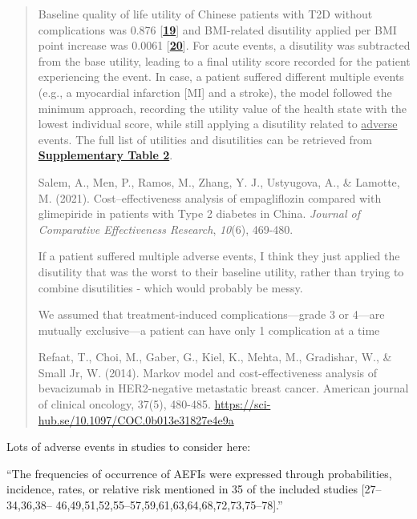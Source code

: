 \documentclass[
]{article}
\begin{document}
\begin{quote}
Baseline quality of life utility of Chinese patients with T2D without
complications was 0.876
{[}\href{https://www.futuremedicine.com/reader/content/17e4aa15614/10.2217/cer-2020-0284/format/epub/EPUB/xhtml/index.xhtml\#B19}{\textbf{19}}{]}
and BMI-related disutility applied per BMI point increase was 0.0061
{[}\href{https://www.futuremedicine.com/reader/content/17e4aa15614/10.2217/cer-2020-0284/format/epub/EPUB/xhtml/index.xhtml\#B20}{\textbf{20}}{]}.
For acute events, a disutility was subtracted from the base utility,
leading to a final utility score recorded for the patient experiencing
the event. In case, a patient suffered different multiple events (e.g.,
a myocardial infarction {[}MI{]} and a stroke), the model followed the
minimum approach, recording the utility value of the health state with
the lowest individual score, while still applying a disutility related
to \underline{adverse} events. The full list of utilities and
disutilities can be retrieved from
\href{https://www.futuremedicine.com/doi/suppl/10.2217/cer-2020-0284}{\textbf{Supplementary
Table 2}}.

Salem, A., Men, P., Ramos, M., Zhang, Y. J., Ustyugova, A., \& Lamotte,
M. (2021). Cost--effectiveness analysis of empagliflozin compared with
glimepiride in patients with Type 2 diabetes in China. \emph{Journal of
Comparative Effectiveness Research}, \emph{10}(6), 469-480.

If a patient suffered multiple adverse events, I think they just applied
the disutility that was the worst to their baseline utility, rather than
trying to combine disutilities - which would probably be messy.

We assumed that treatment-induced complications---grade 3 or 4---are
mutually exclusive---a patient can have only 1 complication at a time

Refaat, T., Choi, M., Gaber, G., Kiel, K., Mehta, M., Gradishar, W., \&
Small Jr, W. (2014). Markov model and cost-effectiveness analysis of
bevacizumab in HER2-negative metastatic breast cancer. American journal
of clinical oncology, 37(5), 480-485.
\url{https://sci-hub.se/10.1097/COC.0b013e31827e4e9a}
\end{quote}

Lots of adverse events in studies to consider here:

``The frequencies of occurrence of AEFIs were expressed through
probabilities, incidence, rates, or relative risk mentioned in 35 of the
included studies {[}27--34,36,38--
46,49,51,52,55--57,59,61,63,64,68,72,73,75--78{]}.''
\end{document}
